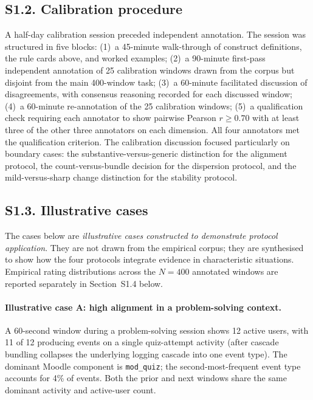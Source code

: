 \documentclass[preprint,12pt,authoryear]{elsarticle}
\begin{document}
\subsection*{S1.2. Calibration procedure}
\label{supp:annotation-calibration}

A half-day calibration session preceded independent annotation. The session was structured in five blocks: (1)~a 45-minute walk-through of construct definitions, the rule cards above, and worked examples; (2)~a 90-minute first-pass independent annotation of 25 calibration windows drawn from the corpus but disjoint from the main 400-window task; (3)~a 60-minute facilitated discussion of disagreements, with consensus reasoning recorded for each discussed window; (4)~a 60-minute re-annotation of the 25 calibration windows; (5)~a qualification check requiring each annotator to show pairwise Pearson $r \geq 0.70$ with at least three of the other three annotators on each dimension. All four annotators met the qualification criterion. The calibration discussion focused particularly on boundary cases: the substantive-versus-generic distinction for the alignment protocol, the count-versus-bundle decision for the dispersion protocol, and the mild-versus-sharp change distinction for the stability protocol.

\subsection*{S1.3. Illustrative cases}
\label{supp:annotation-illustrative}

The cases below are \textit{illustrative cases constructed to demonstrate protocol application}. They are not drawn from the empirical corpus; they are synthesised to show how the four protocols integrate evidence in characteristic situations. Empirical rating distributions across the $N = 400$ annotated windows are reported separately in Section~S1.4 below.

\paragraph{Illustrative case A: high alignment in a problem-solving context.}
A 60-second window during a problem-solving session shows 12 active users, with 11 of 12 producing events on a single quiz-attempt activity (after cascade bundling collapses the underlying logging cascade into one event type). The dominant Moodle component is \texttt{mod\_quiz}; the second-most-frequent event type accounts for 4\% of events. Both the prior and next windows share the same dominant activity and active-user count.
\end{document}
